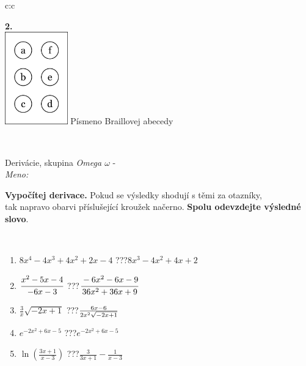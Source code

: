 \documentclass[10pt]{report}
\begin{document}
\begin{tabular}{c:c}
\begin{minipage}[c][104.5mm][t]{0.5\linewidth}
\begin{center}
\begin{minipage}{0.20\linewidth}
\begin{center}
{\Huge\bfseries 2.} \\[2mm]
\includegraphics[height=40mm]{../images/braille.png}
{\small Písmeno Braillovej abecedy}
\end{center}
\end{minipage}
\end{center}
\end{minipage}
\\ \hdashline
\begin{minipage}[c][104.5mm][t]{0.5\linewidth}
\begin{center}
\vspace{7mm}
{\huge Derivácie, skupina \textit{Omega $\omega$} -}\\[5mm]
\textit{Meno:}\phantom{xxxxxxxxxxxxxxxxxxxxxxxxxxxxxxxxxxxxxxxxxxxxxxxxxxxxxxxxxxxxxxxxx}\\[5mm]
\begin{minipage}{0.95\linewidth}
\begin{center}
\textbf{Vypočítej derivace.} Pokud se výsledky shodují s těmi za otazníky,\\tak napravo obarvi příslušející kroužek načerno. \textbf{Spolu odevzdejte výsledné slovo}.
\end{center}
\end{minipage}
\\[1mm]
\begin{minipage}{0.79\linewidth}
\begin{center}
\begin{varwidth}{\linewidth}
\begin{enumerate}
\normalsize
\item $8x^4-4x^3+4x^2+2x-4$\quad \dotfill\; ???\;\dotfill \quad $8x^3-4x^2+4x+2$
\item $\cfrac{x^2-5x-4}{-6x-3}$\quad \dotfill\; ???\;\dotfill \quad $\cfrac{-6x^2-6x-9}{36x^2+36x+9}$
\item $\frac{3}{x}\sqrt{-2x+1}$\quad \dotfill\; ???\;\dotfill \quad $\frac{6x-6}{2x^2 \sqrt{\smash[b]{-2x+1}}}$
\item $e^{-2x^2+6x-5}$\quad \dotfill\; ???\;\dotfill \quad $e^{-2x^2+6x-5}$
\item $\ln{\left(\frac{3x+1}{x-3}\right)}$\quad \dotfill\; ???\;\dotfill \quad $\frac{3}{3x+1}-\frac{1}{x-3}$

\end{enumerate}
\end{varwidth}
\end{center}
\end{minipage}
\end{center}
\end{minipage}
\end{tabular}
\end{document}

